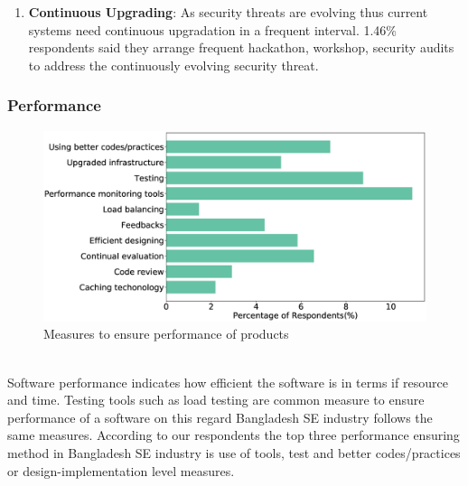 \begin{enumerate}
    \item \textbf{Continuous Upgrading}: As security threats are evolving thus current systems need continuous upgradation in a frequent interval. 1.46\% respondents said they arrange frequent hackathon, workshop, security audits to address the continuously evolving security threat.
    

   
\end{enumerate}

\subsubsection{Performance}
\label{Performance}
\begin{figure}[htbp]
\includegraphics[scale=0.28]{Figures/Performance.eps} 
\caption{Measures to ensure performance of products}
\label{fig:Measures to ensure performance}
\end{figure}
\hfill\\
Software performance indicates how efficient the software is in terms if resource and time. Testing tools such as load testing are common measure\citep{Liu2009} to ensure performance of a software on this regard Bangladesh SE industry follows the same measures. According to our respondents the top three performance ensuring method in Bangladesh SE industry is use of tools, test and better codes/practices or design-implementation level measures. 
